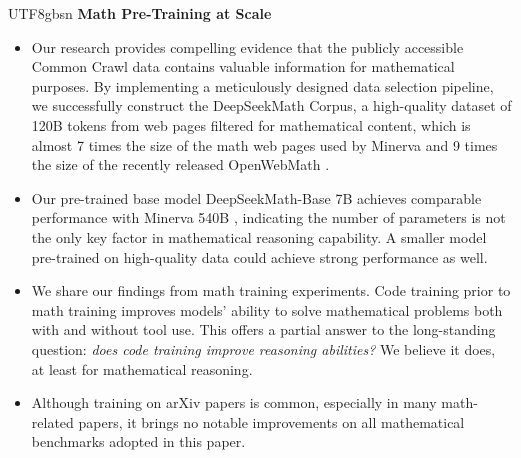 \documentclass[11pt, a4paper, logo, copyright, nonumbering]{deepseek}
\newcommand{\spmath}{DeepSeekMath}
\begin{document}
\begin{CJK*}{UTF8}{gbsn}
\noindent
\textbf{Math Pre-Training at Scale}
\begin{itemize}[topsep=0pt]
    \item Our research provides compelling evidence that the publicly accessible Common Crawl data contains valuable information for mathematical purposes.
    By implementing a meticulously designed data selection pipeline, we successfully construct the DeepSeekMath Corpus, a high-quality dataset of 120B tokens from web pages filtered for mathematical content, which is almost 7 times the size of the math web pages used by Minerva \citep{minerva} and 9 times the size of the recently released OpenWebMath \citep{openwebmath}.

    \item Our pre-trained base model \spmath-Base 7B achieves comparable performance with Minerva 540B \citep{minerva}, indicating the number of parameters is not the only key factor in mathematical reasoning capability.
    A smaller model pre-trained on high-quality data could achieve strong performance as well. 

    \item We share our findings from math training experiments.
    Code training prior to math training improves models' ability to solve mathematical problems both with and without tool use.
    This offers a partial answer to the long-standing question: \textit{does code training improve reasoning abilities?}
    We believe it does, at least for mathematical reasoning.

    \item Although training on arXiv papers is common, especially in many math-related papers, it brings no notable improvements on all mathematical benchmarks adopted in this paper.
\end{itemize}


\end{CJK*}
\end{document}
